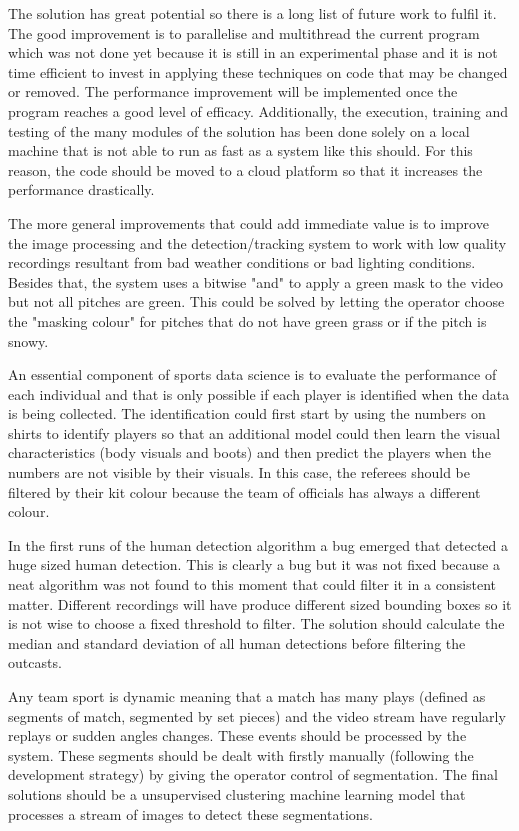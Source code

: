 \documentclass[
11pt,
twoside
]{report}
\begin{document}
The solution has great potential so there is a long list of future work to fulfil it. The good improvement is to parallelise and multithread the current program which was not done yet because it is still in an experimental phase and it is not time efficient to invest in applying these techniques on code that may be changed or removed. The performance improvement will be implemented once the program reaches a good level of efficacy. Additionally, the execution, training and testing of the many modules of the solution has been done solely on a local machine that is not able to run as fast as a system like this should. For this reason, the code should be moved to a cloud platform so that it increases the performance drastically.


The more general improvements that could add immediate value is to improve the image processing and the detection/tracking system to work with low quality recordings resultant from bad weather conditions or bad lighting conditions. Besides that, the system uses a bitwise "and" to apply a green mask to the video but not all pitches are green. This could be solved by letting the operator choose the "masking colour" for pitches that do not have green grass or if the pitch is snowy.


An essential component of sports data science is to evaluate the performance of each individual and that is only possible if each player is identified when the data is being collected. The identification could first start by using the numbers on shirts to identify players so that an additional model could then learn the visual characteristics (body visuals and boots) and then predict the players when the numbers are not visible by their visuals. In this case, the referees should be filtered by their kit colour because the team of officials has always a different colour.


In the first runs of the human detection algorithm a bug emerged that detected a huge sized human detection. This is clearly a bug but it was not fixed because a neat algorithm was not found to this moment that could filter it in a consistent matter. Different recordings will have produce different sized bounding boxes so it is not wise to choose a fixed threshold to filter. The solution should calculate the median and standard deviation of all human detections before filtering the outcasts.


Any team sport is dynamic meaning that a match has many plays (defined as segments of match, segmented by set pieces) and the video stream have regularly replays or sudden angles changes. These events should be processed by the system. These segments should be dealt with firstly manually (following the development strategy) by giving the operator control of segmentation. The final solutions should be a unsupervised clustering machine learning model that processes a stream of images to detect these segmentations.
\end{document}

